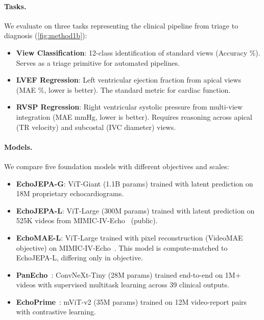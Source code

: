 \documentclass{article}
\theoremstyle{plain}
\theoremstyle{definition}
\theoremstyle{remark}
\begin{document}
\paragraph{Tasks.}
We evaluate on three tasks representing the clinical pipeline from triage to diagnosis (\cref{fig:method1b}):
\begin{itemize}[leftmargin=*, nosep, topsep=0pt]

\item \textbf{View Classification}: 12-class identification of standard views (Accuracy \%). Serves as a triage primitive for automated pipelines.

\item \textbf{LVEF Regression}: Left ventricular ejection fraction from apical views (MAE \%, lower is better). The standard metric for cardiac function.

\item \textbf{RVSP Regression}: Right ventricular systolic pressure from multi-view integration (MAE mmHg, lower is better). Requires reasoning across apical (TR velocity) and subcostal (IVC diameter) views.

\end{itemize}

\paragraph{Models.}
We compare five foundation models with different objectives and scales:
\begin{itemize}[leftmargin=*, nosep, topsep=0pt]

\item \textbf{EchoJEPA-G}: ViT-Giant (1.1B params) trained with latent prediction on 18M proprietary echocardiograms.

\item \textbf{EchoJEPA-L}: ViT-Large (300M params) trained with latent prediction on 525K videos from MIMIC-IV-Echo~\citep{PhysioNet-mimic-iv-echo-0.1} (public).

\item \textbf{EchoMAE-L}: ViT-Large trained with pixel reconstruction (VideoMAE objective) on MIMIC-IV-Echo~\citep{PhysioNet-mimic-iv-echo-0.1}. This model is compute-matched to EchoJEPA-L, differing only in objective.

\item \textbf{PanEcho}~\citep{panecho}: ConvNeXt-Tiny (28M params) trained end-to-end on 1M+ videos with supervised multitask learning across 39 clinical outputs.

\item \textbf{EchoPrime}~\citep{echoprime}: mViT-v2 (35M params) trained on 12M video-report pairs with contrastive learning.

\end{itemize}
\end{document}
